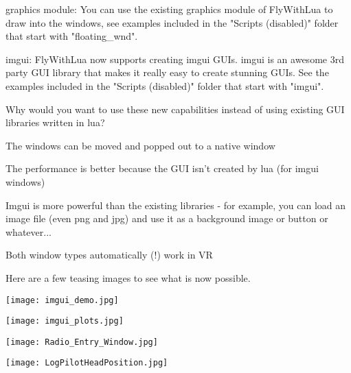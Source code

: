 \documentclass[11pt,parskip=half,a4paper]{scrartcl}
\begin{document}
\hspace*{10mm}	graphics module: You can use the existing graphics module of FlyWithLua to draw into 
\hspace*{10mm}	the windows, see examples included in the "Scripts (disabled)" folder that start with
\hspace*{10mm}	"floating\_wnd".

\hspace*{10mm}	imgui: FlyWithLua now supports creating imgui GUIs. imgui is an awesome 3rd party
\hspace*{10mm}	GUI library that makes it really easy to create stunning GUIs. See the examples included
\hspace*{10mm}	in the "Scripts (disabled)" folder that start with "imgui".

Why would you want to use these new capabilities instead of using existing GUI libraries written in
lua?

\hspace*{10mm}	The windows can be moved and popped out to a native window

\hspace*{10mm}	The performance is better because the GUI isn't created by lua (for imgui windows)

\hspace*{10mm}	Imgui is more powerful than the existing libraries - for example, you can load an image
\hspace*{10mm}	file (even png and jpg) and use it as a background image or button or whatever...

\hspace*{10mm}	Both window types automatically (!) work in VR

Here are a few teasing images to see what is now possible.

\newpage
\begin{center}
\texttt{[image: imgui\_demo.jpg]} 
\end{center}

\begin{center}
\texttt{[image: imgui\_plots.jpg]}
\end{center}

\newpage
\begin{center}
\texttt{[image: Radio\_Entry\_Window.jpg]}
\end{center}

\begin{center}
\texttt{[image: LogPilotHeadPosition.jpg]}
\end{center}
\end{document}
